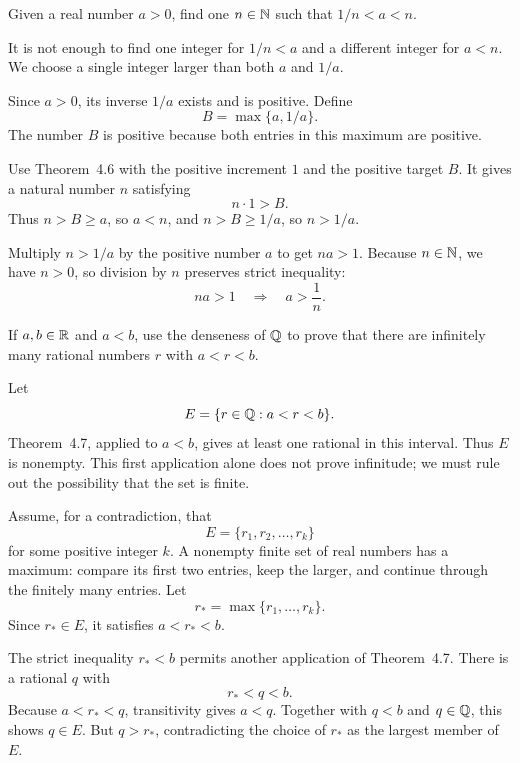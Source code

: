 \goal Given a real number $a>0$, find one $n\in\mathbb{N}$ such that
$1/n<a<n$.

\idea It is not enough to find one integer for $1/n<a$ and a different
integer for $a<n$. We choose a single integer larger than both $a$ and
$1/a$.

Since $a>0$, its inverse $1/a$ exists and is positive. Define
\[
 B=\max\{a,1/a\}.
\]
The number $B$ is positive because both entries in this maximum are
positive.

Use Theorem~4.6 with the positive increment $1$ and the positive target
$B$. It gives a natural number $n$ satisfying
\[
 n\cdot1>B.
\]
Thus $n>B\ge a$, so $a<n$, and $n>B\ge1/a$, so $n>1/a$.

Multiply $n>1/a$ by the positive number $a$ to get
$na>1$. Because $n\in\mathbb{N}$, we have $n>0$, so division by $n$
preserves strict inequality:
\[
 na>1\quad\Longrightarrow\quad a>\frac1n.
\]



\goal If $a,b\in\mathbb{R}$ and $a<b$, use the denseness of $\mathbb{Q}$ to prove
that there are infinitely many rational numbers $r$ with $a<r<b$.

Let
\[
 E=\{r\in\mathbb{Q}:a<r<b\}.
\]
Theorem~4.7, applied to $a<b$, gives at least one rational in this
interval. Thus $E$ is nonempty. This first application alone does not
prove infinitude; we must rule out the possibility that the set is finite.

Assume, for a contradiction, that
\[
 E=\{r_1,r_2,\ldots,r_k\}
\]
for some positive integer $k$. A nonempty finite set of real numbers
has a maximum: compare its first two entries, keep the larger, and
continue through the finitely many entries. Let
\[
 r_* = \max\{r_1,\ldots,r_k\}.
\]
Since $r_*\in E$, it satisfies $a<r_*<b$.

The strict inequality $r_*<b$ permits another application of
Theorem~4.7. There is a rational $q$ with
\[
 r_*<q<b.
\]
Because $a<r_*<q$, transitivity gives $a<q$. Together with $q<b$ and
$q\in\mathbb{Q}$, this shows $q\in E$.
But $q>r_*$, contradicting the choice of $r_*$ as the largest member of
$E$.

